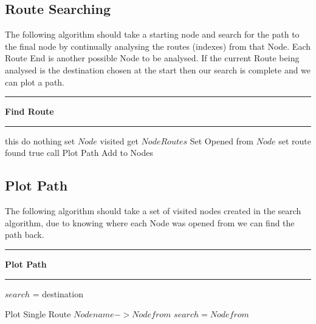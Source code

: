 \subsection{Route Searching}
The following algorithm should take a starting node and search for the path to the final node by continually analysing the routes (indexes) from that Node. Each Route End is another possible Node to be analysed. If the current Route being analysed is the destination chosen at the start then our search is complete and we can plot a path.  
\vspace{0.3cm}
\hrule
\vspace{0.1cm}
\textbf{Find Route}
\vspace{0.1cm}
\hrule
\vspace{0.1cm}
\begin{algorithmic}[1]
 this
    \State do nothing
\Else
	\State set $Node$ visited
    \State get $Node Routes$
    \State Set Opened from $Node$
    		\State set route found true
    		\State call Plot Path
    	\EndIf
    		\State Add to Nodes
    	\EndIf
    	
    \EndFor
\EndIf
\EndFor
\EndWhile
\end{algorithmic}

\subsection{Plot Path}
The following algorithm should take a set of visited nodes created in the search algorithm, due to knowing where each Node was opened from we can find the path back.
\vspace{0.3cm}
\hrule
\vspace{0.1cm}
\textbf{Plot Path}
\vspace{0.1cm}
\hrule
\vspace{0.1cm}
\begin{algorithmic}[1]
\State$search$ = destination
	
		\State Plot Single Route $Node name -> Node from$
		\State $search = Node from$
	\EndIf
\EndFor
\EndFor
\end{algorithmic}
